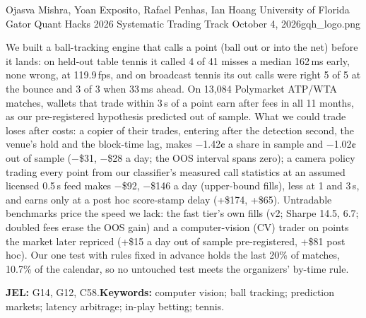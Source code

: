 \documentclass[11pt,letterpaper]{article}
\begin{document}
  {Ojasva Mishra, Yoan Exposito, Rafael Penhas, Ian Hoang \textperiodcentered{} University of Florida}
  {Gator Quant Hacks 2026 \textperiodcentered{} Systematic Trading Track}
  {October 4, 2026}{gqh_logo.png}

\begin{csabstract}
We built a ball-tracking engine that calls a point (ball out or into the net) before it lands: on
held-out table tennis it called 4 of 41 misses a median
162\,ms early, none wrong, at 119.9\,fps, and on broadcast tennis its out calls were
right 5 of 5 at the bounce and 3 of 3 when 33\,ms ahead. On
13,084 Polymarket ATP/WTA matches, wallets that trade within 3\,s of a point earn after fees in all
11 months, as our pre-registered hypothesis predicted out of sample. What we could trade
loses after costs: a copier of their trades, entering after the detection second, the venue's hold and the block-time
lag, makes −1.42¢ a share in sample and −1.02¢ out of sample (−\$31,
−\$28 a day; the OOS interval spans zero); a camera policy trading every point from our classifier's
measured call statistics at an assumed licensed 0.5\,s feed makes −\$92, −\$146
a day (upper-bound fills), less at 1 and 3\,s, and earns only at a post hoc score-stamp delay
(+\$174, +\$65). Untradable benchmarks price the speed we lack: the
fast tier's own fills (v2; Sharpe 14.5, 6.7; doubled fees erase the OOS gain) and a computer-vision (CV) trader on
points the market later repriced (+\$15 a day out of sample pre-registered,
+\$81 post hoc). Our one test with rules fixed in advance holds the last 20\% of matches,
10.7\% of the calendar, so no untouched test meets the organizers' by-time rule.

\vspace{2pt}\noindent\textbf{JEL:} G14, G12, C58.\enspace \textbf{Keywords:} computer vision; ball tracking; prediction
markets; latency arbitrage; in-play betting; tennis.
\end{csabstract}
\end{document}
